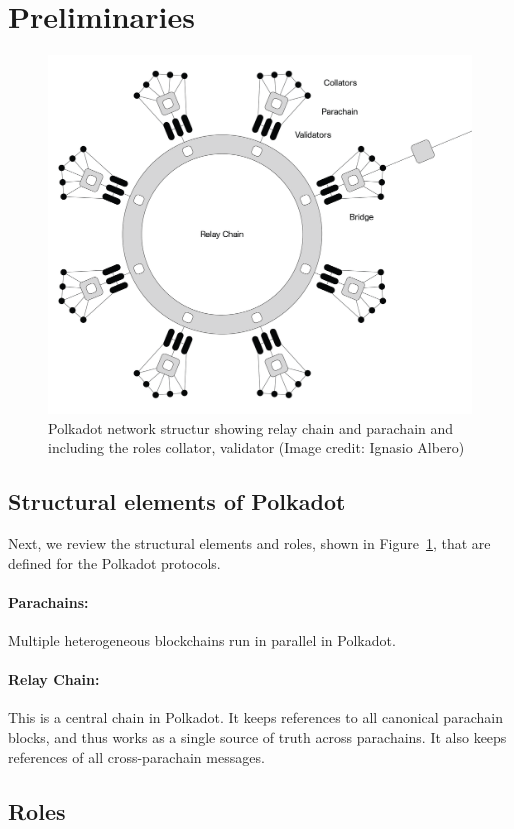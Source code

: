 \section{Preliminaries}\label{sec:preliminiary}
\begin{figure}[h]
	\centering
	\includegraphics[width=.7\textwidth]{images/Network@2x.png}
	\caption{Polkadot network structur showing relay chain and parachain and including the roles collator, validator (Image credit: Ignasio Albero)}
	\label{fig:roles}
\end{figure}
\subsection{Structural elements of Polkadot}
Next, we review the structural elements and roles, shown in Figure~\ref{fig:roles}, that are defined for the Polkadot protocols.
\paragraph{Parachains:} Multiple heterogeneous blockchains run in parallel in Polkadot.

\paragraph{Relay Chain:} This is a central chain in Polkadot. It keeps references
to all canonical parachain blocks, and thus works as a single source of truth across parachains.
It also keeps references of all cross-parachain messages.

\subsection{Roles}


